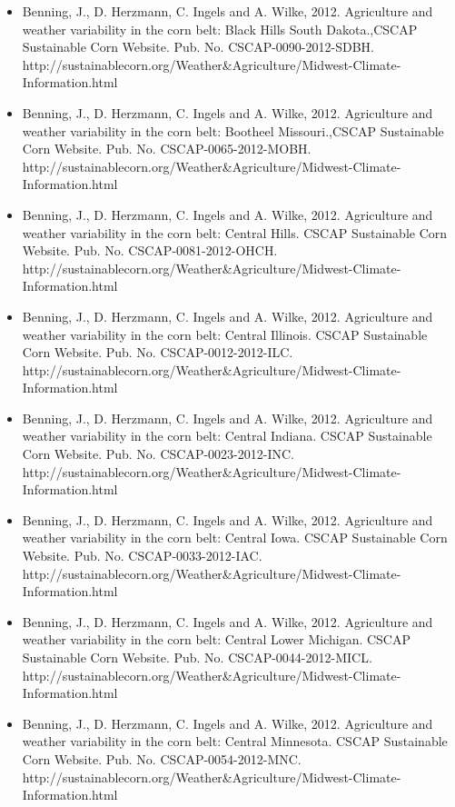 \begin{itemize}
\item Benning, J., D. Herzmann, C. Ingels and A. Wilke, 2012. Agriculture and weather variability in the corn belt: Black Hills South Dakota.,CSCAP Sustainable Corn Website. Pub. No. CSCAP-0090-2012-SDBH. http://sustainablecorn.org/Weather\&Agriculture/Midwest-Climate-Information.html
\item Benning, J., D. Herzmann, C. Ingels and A. Wilke, 2012. Agriculture and weather variability in the corn belt: Bootheel Missouri.,CSCAP Sustainable Corn Website. Pub. No. CSCAP-0065-2012-MOBH. http://sustainablecorn.org/Weather\&Agriculture/Midwest-Climate-Information.html
\item Benning, J., D. Herzmann, C. Ingels and A. Wilke, 2012. Agriculture and weather variability in the corn belt: Central Hills. CSCAP Sustainable Corn Website. Pub. No. CSCAP-0081-2012-OHCH. http://sustainablecorn.org/Weather\&Agriculture/Midwest-Climate-Information.html
\item Benning, J., D. Herzmann, C. Ingels and A. Wilke, 2012. Agriculture and weather variability in the corn belt: Central Illinois. CSCAP Sustainable Corn Website. Pub. No. CSCAP-0012-2012-ILC. http://sustainablecorn.org/Weather\&Agriculture/Midwest-Climate-Information.html
\item Benning, J., D. Herzmann, C. Ingels and A. Wilke, 2012. Agriculture and weather variability in the corn belt: Central Indiana. CSCAP Sustainable Corn Website. Pub. No. CSCAP-0023-2012-INC. http://sustainablecorn.org/Weather\&Agriculture/Midwest-Climate-Information.html
\item Benning, J., D. Herzmann, C. Ingels and A. Wilke, 2012. Agriculture and weather variability in the corn belt: Central Iowa. CSCAP Sustainable Corn Website. Pub. No. CSCAP-0033-2012-IAC. http://sustainablecorn.org/Weather\&Agriculture/Midwest-Climate-Information.html
\item Benning, J., D. Herzmann, C. Ingels and A. Wilke, 2012. Agriculture and weather variability in the corn belt: Central Lower Michigan. CSCAP Sustainable Corn Website. Pub. No. CSCAP-0044-2012-MICL. http://sustainablecorn.org/Weather\&Agriculture/Midwest-Climate-Information.html
\item Benning, J., D. Herzmann, C. Ingels and A. Wilke, 2012. Agriculture and weather variability in the corn belt: Central Minnesota. CSCAP Sustainable Corn Website. Pub. No. CSCAP-0054-2012-MNC. http://sustainablecorn.org/Weather\&Agriculture/Midwest-Climate-Information.html

\end{itemize}
